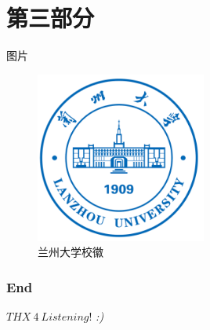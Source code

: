 \documentclass{ldr-simple-gray}
\begin{document}
  \section{第三部分}
  \begin{frame}{图片}
    \begin{figure}
      \centering
      \includegraphics[width=0.5\textwidth]{./figures/lzu_logo.png}
      \caption{兰州大学校徽}
    \end{figure}
  \end{frame}

  \begin{frame} %
    \frametitle{End}
    \begin{center}
      \Huge{$THX\ 4\ Listening!$}
      \emph{:)}
    \end{center}
  \end{frame}
\end{document}
